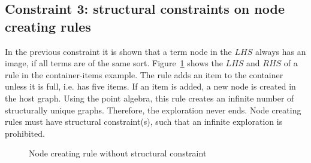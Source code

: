 \subsection{Constraint 3: structural constraints on node creating rules}
In the previous constraint it is shown that a term node in the $\mathit{LHS}$ always has an image, if all terms are of the same sort. Figure~\ref{fig:item_example_c4} shows the $\mathit{LHS}$ and $\mathit{RHS}$ of a rule in the container-items example. The rule adds an item to the container unless it is full, i.e. has five items. If an item is added, a new node is created in the host graph. Using the point algebra, this rule creates an infinite number of structurally unique graphs. Therefore, the exploration never ends. Node creating rules must have structural constraint(s), such that an infinite exploration is prohibited.

\begin{figure}[ht]
  \begin{center}
    \subfloat[LHS]{\label{fig:item_example_c4_lhs}\parbox[b]{6cm}{\centering}}
    \subfloat[RHS]{\label{fig:item_example_c4_rhs}\parbox[b]{6cm}{\centering}}
  \end{center}
  \caption{Node creating rule without structural constraint}
  \label{fig:item_example_c4}
\end{figure}
